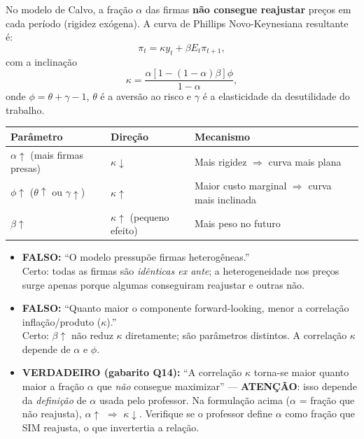 \documentclass[12pt, a4paper]{article}
\begin{document}
No modelo de Calvo, a fração $\alpha$ das firmas \textbf{não consegue reajustar} preços em cada período (rigidez exógena). A curva de Phillips Novo-Keynesiana resultante é:
\[
  \pi_t = \kappa y_t + \beta E_t \pi_{t+1},
\]
com a inclinação
\[
  \boxed{\kappa = \frac{\alpha[1-(1-\alpha)\beta]\phi}{1-\alpha}},
\]
onde $\phi = \theta + \gamma - 1$, $\theta$ é a aversão ao risco e $\gamma$ é a elasticidade da desutilidade do trabalho.

\begin{fatorbox}[title={Efeito de cada parâmetro em $\kappa$}]
\begin{center}
\begin{tabular}{lll}
\toprule
Parâmetro & Direção & Mecanismo \\
\midrule
$\alpha\uparrow$ (mais firmas presas) & $\kappa\downarrow$ & Mais rigidez $\Rightarrow$ curva mais plana \\
$\phi\uparrow$ ($\theta\uparrow$ ou $\gamma\uparrow$) & $\kappa\uparrow$ & Maior custo marginal $\Rightarrow$ curva mais inclinada \\
$\beta\uparrow$ & $\kappa\uparrow$ (pequeno efeito) & Mais peso no futuro \\
\bottomrule
\end{tabular}
\end{center}
\end{fatorbox}

\begin{armbox}[title={Armadilhas (Q14)}]
\begin{itemize}[leftmargin=*]
  \item \textbf{FALSO:} ``O modelo pressupõe firmas heterogêneas.'' \\ Certo: todas as firmas são \emph{idênticas ex ante}; a heterogeneidade nos preços surge apenas porque algumas conseguiram reajustar e outras não.
  \item \textbf{FALSO:} ``Quanto maior o componente forward-looking, menor a correlação inflação/produto ($\kappa$).'' \\ Certo: $\beta\uparrow$ não reduz $\kappa$ diretamente; são parâmetros distintos. A correlação $\kappa$ depende de $\alpha$ e $\phi$.
  \item \textbf{VERDADEIRO (gabarito Q14):} ``A correlação $\kappa$ torna-se maior quanto maior a fração $\alpha$ que \emph{não} consegue maximizar'' — \textbf{ATENÇÃO}: isso depende da \emph{definição} de $\alpha$ usada pelo professor. Na formulação acima ($\alpha$ = fração que não reajusta), $\alpha\uparrow$ $\Rightarrow$ $\kappa\downarrow$. Verifique se o professor define $\alpha$ como fração que SIM reajusta, o que invertertia a relação.
\end{itemize}
\end{armbox}
\end{document}
